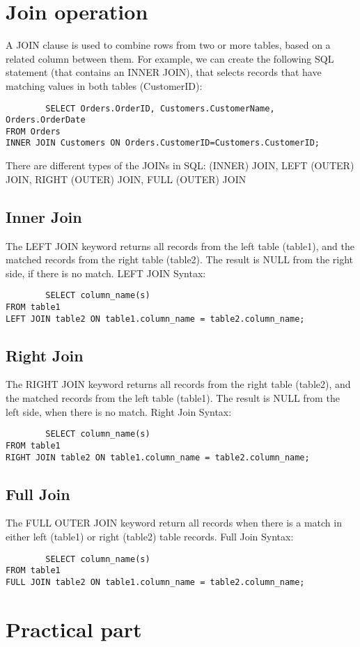 \documentclass[a4paper]{article}
\begin{document}
    \section{Join operation}
    A JOIN clause is used to combine rows from two or more tables, based on a related column between them. For example, we can create the following SQL statement (that contains an INNER JOIN), that selects records that have matching values in both tables (CustomerID):
    \begin{verbatim}
        SELECT Orders.OrderID, Customers.CustomerName, Orders.OrderDate
FROM Orders
INNER JOIN Customers ON Orders.CustomerID=Customers.CustomerID; 
    \end{verbatim}
    There are different types of the JOINs in SQL: (INNER) JOIN, LEFT (OUTER) JOIN, RIGHT (OUTER) JOIN, FULL (OUTER) JOIN
    \subsection{Inner Join}
    The LEFT JOIN keyword returns all records from the left table (table1), and the matched records from the right table (table2). The result is NULL from the right side, if there is no match.
    LEFT JOIN Syntax:
    \begin{verbatim}
        SELECT column_name(s)
FROM table1
LEFT JOIN table2 ON table1.column_name = table2.column_name;
    \end{verbatim}
    \subsection{Right Join}
    The RIGHT JOIN keyword returns all records from the right table (table2), and the matched records from the left table (table1). The result is NULL from the left side, when there is no match.
    Right Join Syntax:
    \begin{verbatim}
        SELECT column_name(s)
FROM table1
RIGHT JOIN table2 ON table1.column_name = table2.column_name;
    \end{verbatim}
    \subsection{Full Join}
    The FULL OUTER JOIN keyword return all records when there is a match in either left (table1) or right (table2) table records.
    Full Join Syntax:
    \begin{verbatim}
        SELECT column_name(s)
FROM table1
FULL JOIN table2 ON table1.column_name = table2.column_name;
    \end{verbatim}
    \section{Practical part}
\end{document}
